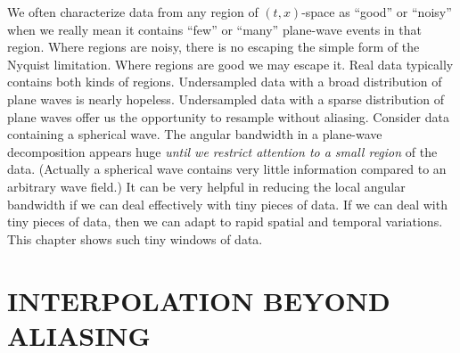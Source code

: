 \par
We often characterize data from
any region of $(t,x)$-space as ``good'' or ``noisy''
when we really mean it contains ``few'' or ``many'' plane-wave events
in that region.
Where regions are noisy,
there is no escaping the simple form of the Nyquist limitation.
Where regions are good we may escape it.
Real data typically contains both kinds of regions.
Undersampled data with a broad distribution of plane waves is nearly hopeless.
Undersampled data with a sparse distribution of plane waves
offer us the opportunity to resample without aliasing.
Consider data containing a spherical wave.
The angular bandwidth in a plane-wave decomposition appears huge
{\it until we restrict attention to a small region} of the data.
(Actually a spherical wave contains very little information
compared to an arbitrary wave field.)
It can be very helpful in reducing the local angular bandwidth
if we can deal effectively with tiny pieces of data.
If we can deal with tiny pieces of data,
then we can adapt to rapid spatial and temporal variations.
This chapter shows such tiny windows of data.

\section{INTERPOLATION BEYOND ALIASING}

